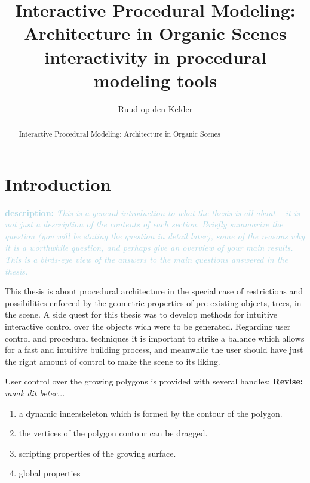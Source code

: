 \documentclass{article}
\title{Interactive Procedural Modeling: Architecture in Organic Scenes  \small{interactivity in procedural modeling tools}}
\author{Ruud op den Kelder}
\newcommand{\revise}[1]{\textcolor{myOrange}{\textbf{\newline Revise: }\it{#1}}}
\newcommand{\desc}[1]{\textcolor{lightblue}{\textbf{\newline description: }\it{#1} \newline}}
\begin{document}
\maketitle

\begin{abstract}
Interactive Procedural Modeling: Architecture in Organic Scenes 
\end{abstract}
\newpage 

\tableofcontents
\newpage 

\section{Introduction}

\desc{This is a general introduction to what the thesis is all about -- it is not just a description of the contents of each section. Briefly summarize the question (you will be stating the question in detail later), some of the reasons why it is a worthwhile question, and perhaps give an overview of your main results. This is a birds-eye view of the answers to the main questions answered in the thesis.}

This thesis is about procedural architecture in the special case of restrictions and possibilities enforced by the geometric properties of
pre-existing objects, trees, in the scene. A side quest for this thesis was to develop methods for intuitive interactive control over the 
objects wich were to be generated. Regarding user control and procedural techniques it is important to strike a balance which allows for a 
fast and intuitive building process, and meanwhile the user should have just the right amount of control to make the scene to its liking. 



     






User control over the growing polygons is provided with several handles: 
\revise{maak dit beter...}

\begin{enumerate}
\item a dynamic innerskeleton which is formed by the contour of the polygon.   
\item the vertices of the polygon contour can be dragged.
\item scripting properties of the growing surface.
\item global properties
\end{enumerate}
\end{document}
